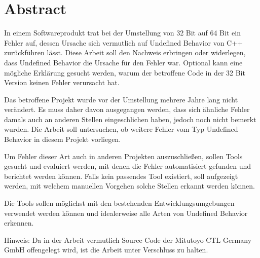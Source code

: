 \chapter*{Abstract}
\label{ch:abstract}
In einem Softwareprodukt trat bei der Umstellung von 32 Bit auf 64 Bit ein Fehler auf,
dessen Ursache sich vermutlich auf Undefined Behavior von C++ zurückführen lässt.
Diese Arbeit soll den Nachweis erbringen oder widerlegen, dass Undefined Behavior die Ursache für den Fehler war.
Optional kann eine mögliche Erklärung gesucht werden, warum der betroffene Code in der 32 Bit Version keinen Fehler verursacht hat.

Das betroffene Projekt wurde vor der Umstellung mehrere Jahre lang nicht verändert. Es muss daher davon ausgegangen werden,
dass sich ähnliche Fehler damals auch an anderen Stellen eingeschlichen haben, jedoch noch nicht  bemerkt wurden.
Die Arbeit soll untersuchen, ob weitere Fehler vom Typ Undefined Behavior in diesem Projekt vorliegen.

Um Fehler dieser Art auch in anderen Projekten auszuschließen, sollen Tools gesucht und evaluiert werden,
mit denen die Fehler automatisiert gefunden und berichtet werden können. Falls kein passendes Tool existiert, soll aufgezeigt werden,
mit welchem manuellen Vorgehen solche Stellen erkannt werden können.

Die Tools sollen möglichst mit den bestehenden Entwicklungsumgebungen verwendet werden können und idealerweise alle Arten von
Undefined Behavior erkennen.

Hinweis: Da in der Arbeit vermutlich Source Code der Mitutoyo CTL Germany GmbH offengelegt wird, ist die Arbeit unter Verschluss zu halten.

